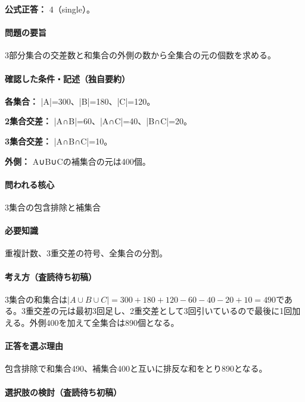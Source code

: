 \textbf{公式正答：} 4（single）。

\paragraph{問題の要旨} 3部分集合の交差数と和集合の外側の数から全集合の元の個数を求める。

\paragraph{確認した条件・記述（独自要約）}\mbox{}\par

\noindent\textbf{各集合：} |A|=300、|B|=180、|C|=120。\par

\noindent\textbf{2集合交差：} |A∩B|=60、|A∩C|=40、|B∩C|=20。\par

\noindent\textbf{3集合交差：} |A∩B∩C|=10。\par

\noindent\textbf{外側：} A∪B∪Cの補集合の元は400個。\par

\paragraph{問われる核心} 3集合の包含排除と補集合

\paragraph{必要知識} 重複計数、3重交差の符号、全集合の分割。

\paragraph{考え方（査読待ち初稿）} 3集合の和集合は\(|A\cup B\cup C|=300+180+120-60-40-20+10=490\)である。3重交差の元は最初3回足し、2重交差として3回引いているので最後に1回加える。外側400を加えて全集合は890個となる。

\paragraph{正答を選ぶ理由} 包含排除で和集合490、補集合400と互いに排反な和をとり890となる。

\paragraph{選択肢の検討（査読待ち初稿）}\mbox{}\par

